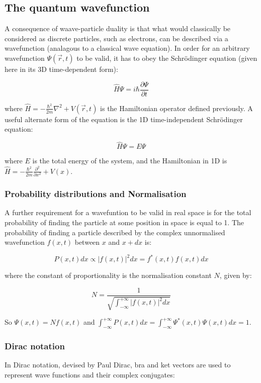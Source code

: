 \subsection{The quantum wavefunction}

A consequence of waave-particle duality is that what would classically be considered as discrete particles, such as electrons, can be described via a wavefunction (analagous to a classical wave equation). In order for an arbitrary wavefunction $\Psi(\vec{r}, t)$ to be valid, it has to obey the Schr\"odinger equation (given here in its 3D time-dependent form):

\[ \hat{H}\Psi = i\hbar\frac{\partial\Psi}{\partial t} \]

where $\hat{H} = -\frac{\hbar^2}{2m}\nabla^2 + V(\vec{r}, t)$ is the Hamiltonian operator defined previously. A useful alternate form of the equation is the 1D time-independent Schr\"odinger equation:

\[ \hat{H}\Psi = E\Psi \]

where $E$ is the total energy of the system, and the Hamiltonian in 1D is $\hat{H} = -\frac{\hbar^2}{2m}\frac{\partial^2}{\partial x^2} + V(x)$.

\subsubsection*{Probability distributions and Normalisation}

A further requirement for a wavefuntion to be valid in real space is for the total probability of finding the particle at some position in space is equal to 1. The probability of finding a particle described by the complex unnormalised wavefunction $f(x,t)$ between $x$ and $x+dx$ is:

\[ P(x,t)dx \propto \left|f(x,t)\right|^2 dx = f^*(x,t)f(x,t) dx \]

where the constant of proportionality is the normalisation constant $N$, given by:

\[ N = \frac{1}{\sqrt{\int_{-\infty}^{+\infty} \left|f(x,t)\right|^2 dx}} \]

So $\Psi(x,t) = Nf(x,t)$ and $\int_{-\infty}^{+\infty} P(x,t)dx = \int_{-\infty}^{+\infty} \Psi^*(x,t)\Psi(x,t)dx = 1$.

\subsubsection*{Dirac notation}

In Dirac notation, devised by Paul Dirac, bra and ket vectors are used to represent wave functions and their complex conjugates:

